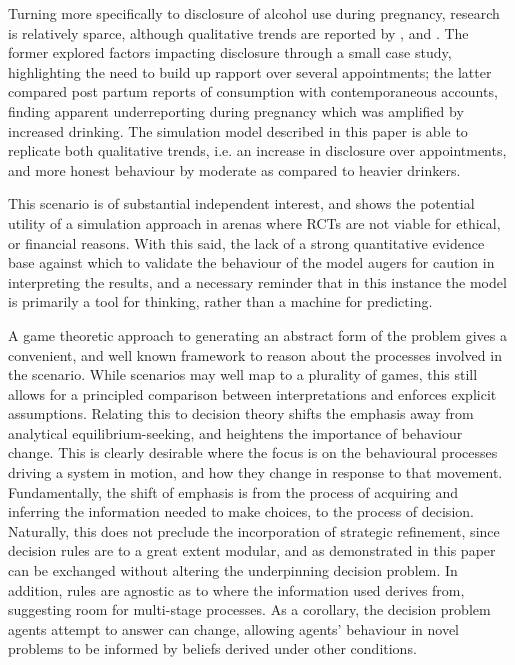 Turning more specifically to disclosure of alcohol use during pregnancy, research is relatively sparce, although qualitative trends are reported by \citet{Phillips2007}, and \citet{Alvik2006}. The former explored factors impacting disclosure through a small case study, highlighting the need to build up rapport over several appointments; the latter compared post partum reports of consumption with contemporaneous accounts, finding apparent underreporting during pregnancy which was amplified by increased drinking. The simulation model described in this paper is able to replicate both qualitative trends, i.e. an increase in disclosure over appointments, and more honest behaviour by moderate as compared to heavier drinkers.

This scenario is of substantial independent interest, and shows the potential utility of a simulation approach in arenas where \acp{RCT} are not viable for ethical, or financial reasons. With this said, the lack of a strong quantitative evidence base against which to validate the behaviour of the model augers for caution in interpreting the results, and a necessary reminder that in this instance the model is primarily a tool for thinking, rather than a machine for predicting.


A game theoretic approach to generating an abstract form of the problem gives a convenient, and well known framework to reason about the processes involved in the scenario. While scenarios may well map to a plurality of games, this still allows for a principled comparison between interpretations and enforces explicit assumptions. Relating this to decision theory shifts the emphasis away from analytical equilibrium-seeking, and heightens the importance of behaviour change. This is clearly desirable where the focus is on the behavioural processes driving a system in motion, and how they change in response to that movement.
Fundamentally, the shift of emphasis is from the process of acquiring and inferring the information needed to make choices, to the process of decision.
Naturally, this does not preclude the incorporation of strategic refinement, since decision rules are to a great extent modular, and as demonstrated in this paper can be exchanged without altering the underpinning decision problem. In addition, rules are agnostic as to where the information used derives from, suggesting room for multi-stage processes.  As a corollary, the decision problem agents attempt to answer can change, allowing agents' behaviour in novel problems to be informed by beliefs derived under other conditions. 

